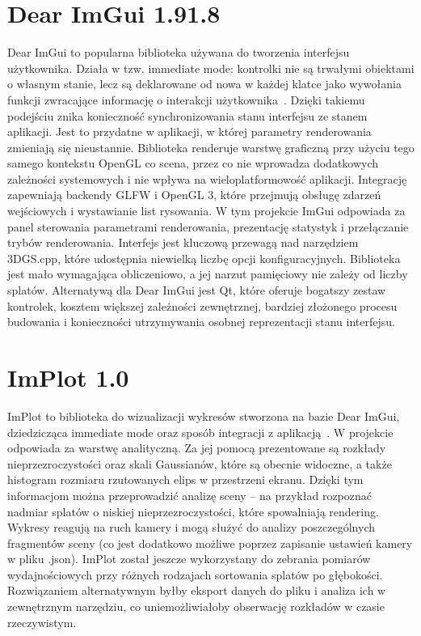 \section{Dear ImGui 1.91.8}
\label{imgui}
Dear ImGui to popularna biblioteka używana do tworzenia interfejsu użytkownika. Działa w tzw. immediate mode: kontrolki nie są trwałymi obiektami o własnym stanie, lecz są deklarowane od nowa w każdej klatce jako wywołania funkcji zwracające informację o interakcji użytkownika~\cite{imgui1918repo}. Dzięki takiemu podejściu znika konieczność synchronizowania stanu interfejsu ze stanem aplikacji. Jest to przydatne w aplikacji, w której parametry renderowania zmieniają się nieustannie. Biblioteka renderuje warstwę graficzną przy użyciu tego samego kontekstu OpenGL co scena, przez co nie wprowadza dodatkowych zależności systemowych i nie wpływa na wieloplatformowość aplikacji. Integrację zapewniają backendy GLFW i OpenGL 3, które przejmują obsługę zdarzeń wejściowych i wystawianie list rysowania. W tym projekcie ImGui odpowiada za panel sterowania parametrami renderowania, prezentację statystyk i przełączanie trybów renderowania. Interfejs jest kluczową przewagą nad narzędziem 3DGS.cpp, które udostępnia niewielką liczbę opcji konfiguracyjnych. Biblioteka jest mało wymagająca obliczeniowo, a jej narzut pamięciowy nie zależy od liczby splatów. Alternatywą dla Dear ImGui jest Qt, które oferuje bogatszy zestaw kontrolek, kosztem większej zależności zewnętrznej, bardziej złożonego procesu budowania i konieczności utrzymywania osobnej reprezentacji stanu interfejsu.
\section{ImPlot 1.0}
\label{implot}
ImPlot to biblioteka do wizualizacji wykresów stworzona na bazie Dear ImGui, dziedzicząca immediate mode oraz sposób integracji z aplikacją~\cite{implotrepo}. W projekcie odpowiada za warstwę analityczną. Za jej pomocą prezentowane są rozkłady nieprzezroczystości oraz skali Gaussianów, które są obecnie widoczne, a także histogram rozmiaru rzutowanych elips w przestrzeni ekranu. Dzięki tym informacjom można przeprowadzić analizę sceny -- na przykład rozpoznać nadmiar splatów o niskiej nieprzezroczystości, które spowalniają rendering. Wykresy reagują na ruch kamery i mogą służyć do analizy poszczególnych fragmentów sceny (co jest dodatkowo możliwe poprzez zapisanie ustawień kamery w pliku .json). ImPlot został jeszcze wykorzystany do zebrania pomiarów wydajnościowych przy różnych rodzajach sortowania splatów po głębokości. Rozwiązaniem alternatywnym byłby eksport danych do pliku i analiza ich w zewnętrznym narzędziu, co uniemożliwiałoby obserwację rozkładów w czasie rzeczywistym.
